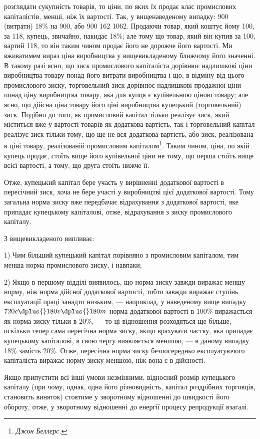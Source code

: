 \parcont{}  %
розглядати сукупність товарів, то ціни, по яких їх продає клас
промислових капіталістів, менші, ніж їх вартості. Так, у вищенаведеному випадку: 900 (витрати) \dplus{} 18\%
на 900, або 900 \dplus{} 162 \deq{}
1062. Продаючи товар, який коштує йому 100, за 118, купець, звичайно,
накидає 18\%; але тому що товар, який він купив за 100,
вартий 118, то він таким чином продає його не дорожче його
вартості. Ми вживатимем вираз ціна виробництва у вищевикладеному
ближчому його значенні. В такому разі ясно, що зиск
промислового капіталіста дорівнює надлишкові ціни виробництва
товару понад його витрати виробництва і що, в відміну від цього
промислового зиску, торговельний зиск дорівнює надлишкові
продажної ціни понад ціну виробництва товару, яка для купця
є купівельною ціною товару; але ясно, що дійсна ціна товару \deq{}
його ціні виробництва \dplus{} купецький (торговельний) зиск. Подібно
до того, як промисловий капітал тільки реалізує зиск, який міститься
вже у вартості товарів як додаткова вартість, так і торговельний
капітал реалізує зиск тільки тому, що ще не вся
додаткова вартість, або зиск, реалізована в ціні товару, реалізованій
промисловим капіталом\footnote{
\emph{Джон Беллерс.}
}. Таким чином, ціна, по якій купець
продає, стоїть вище його купівельної ціни не тому, що
перша стоїть вище всієї вартості, а тому, що друга стоїть нижче її.

Отже, купецький капітал бере участь у вирівненні додаткової
вартості в пересічний зиск, хоча не бере участі у виробництві
цієї додаткової вартості. Тому загальна норма зиску вже
передбачає відрахування з додаткової вартості, яке припадає купецькому
капіталові, отже, відрахування з зиску промислового
капіталу.

З вищевикладеного випливає:

1) Чим більший купецький капітал порівняно з промисловим
капіталом, тим менша норма промислового зиску, і навпаки;

2) Якщо в першому відділі виявилось, що норма зиску завжди
виражає меншу норму, ніж норма дійсної додаткової вартості,
тобто завжди виражає ступінь експлуатації праці занадто низьким,
— наприклад, у наведеному вище випадку $720 c \dplus{} 180 v \dplus{} 180 m$
норма додаткової вартості в 100\% виражається як норма зиску
тільки в 20\%, — то ці відношення розходяться ще більше,
оскільки тепер сама пересічна норма зиску, якщо врахувати
частку, яка припадає купецькому капіталові, в свою чергу виявляється
меншою, — в даному випадку 18\% замість 20\%. Отже,
пересічна норма зиску безпосередньо експлуатуючого капіталіста
виражає норму зиску меншою, ніж вона є в дійсності.

Якщо припустити всі інші умови незмінними, відносний розмір
купецького капіталу (при чому, однак, одна його різновидність,
капітал роздрібних торговців, становить виняток) стоятиме
у зворотному відношенні до швидкості його обороту, отже,
у зворотному відношенні до енергії процесу репродукції взагалі.
\parbreak{}  %
